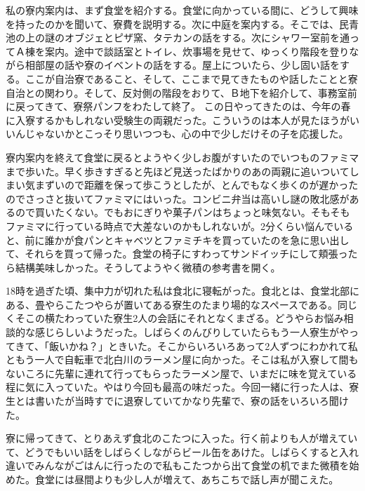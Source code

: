 \par
私の寮内案内は、まず食堂を紹介する。食堂に向かっている間に、どうして興味を持ったのかを聞いて、寮費を説明する。次に中庭を案内する。そこでは、民青池の上の謎のオブジェとピザ窯、タテカンの話をする。次にシャワー室前を通ってＡ棟を案内。途中で談話室とトイレ、炊事場を見せて、ゆっくり階段を登りながら相部屋の話や寮のイベントの話をする。屋上についたら、少し固い話をする。ここが自治寮であること、そして、ここまで見てきたものや話したことと寮自治との関わり。そして、反対側の階段をおりて、Ｂ地下を紹介して、事務室前に戻ってきて、寮祭パンフをわたして終了。
この日やってきたのは、今年の春に入寮するかもしれない受験生の両親だった。こういうのは本人が見たほうがいいんじゃないかとこっそり思いつつも、心の中で少しだけその子を応援した。

\par
寮内案内を終えて食堂に戻るとようやく少しお腹がすいたのでいつものファミマまで歩いた。早く歩きすぎると先ほど見送ったばかりのあの両親に追いついてしまい気まずいので距離を保って歩こうとしたが、とんでもなく歩くのが遅かったのでさっさと抜いてファミマにはいった。コンビニ弁当は高いし謎の敗北感があるので買いたくない。でもおにぎりや菓子パンはちょっと味気ない。そもそもファミマに行っている時点で大差ないのかもしれないが。2分くらい悩んでいると、前に誰かが食パンとキャベツとファミチキを買っていたのを急に思い出して、それらを買って帰った。食堂の椅子にすわってサンドイッチにして頬張ったら結構美味しかった。そうしてようやく微積の参考書を開く。

\par
18時を過ぎた頃、集中力が切れた私は食北に寝転がった。食北とは、食堂北部にある、畳やらこたつやらが置いてある寮生のたまり場的なスペースである。同じくそこの横たわっていた寮生2人の会話にそれとなくまざる。どうやらお悩み相談的な感じらしいようだった。しばらくのんびりしていたらもう一人寮生がやってきて、「飯いかね？」ときいた。そこからいろいろあって2人ずつにわかれて私ともう一人で自転車で北白川のラーメン屋に向かった。そこは私が入寮して間もないころに先輩に連れて行ってもらったラーメン屋で、いまだに味を覚えている程に気に入っていた。やはり今回も最高の味だった。今回一緒に行った人は、寮生とは書いたが当時すでに退寮していてかなり先輩で、寮の話をいろいろ聞けた。

\par
寮に帰ってきて、とりあえず食北のこたつに入った。行く前よりも人が増えていて、どうでもいい話をしばらくしながらビール缶をあけた。しばらくすると入れ違いでみんながごはんに行ったので私もこたつから出て食堂の机でまた微積を始めた。食堂には昼間よりも少し人が増えて、あちこちで話し声が聞こえた。

